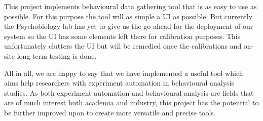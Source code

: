 \documentclass[landscape,final]{baposter}
\begin{document}
\begin{poster}
{
\vspace{-5pt}
    \label{fig:figure}
\vspace{5pt}
\par This project implements behavioural data gathering tool that is as easy to use as possible. For this purpose the tool will as simple a UI as possible. But currently the Psychobiology lab has yet to give us the go ahead for the deployment of our system so the UI has some elements left there for calibration purposes. This unfortunately clutters the UI but will be remedied once the calibrations and on-site long term testing is done. \\

\par All in all, we are happy to say that we have implemented a useful tool which aims help researchers with experiment automation in behavioural analysis studies. As both experiment automation and behavioural analysis are fields that are of much interest both academia and industry, this project has the potential to be further improved upon to create more versatile and precise tools.\\

}%


\end{poster}%
%
\end{document}
